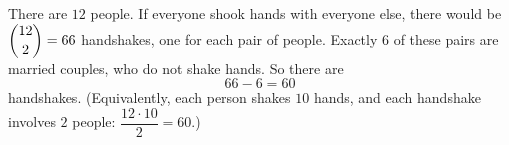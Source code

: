 There are $12$ people. If everyone shook hands with everyone else, there would be $\dbinom{12}{2}=66$ handshakes, one for each pair of people. Exactly $6$ of these pairs are married couples, who do not shake hands. So there are
\[66-6=\boxed{60}\]
handshakes. (Equivalently, each person shakes $10$ hands, and each handshake involves $2$ people: $\dfrac{12\cdot10}{2}=60$.)

